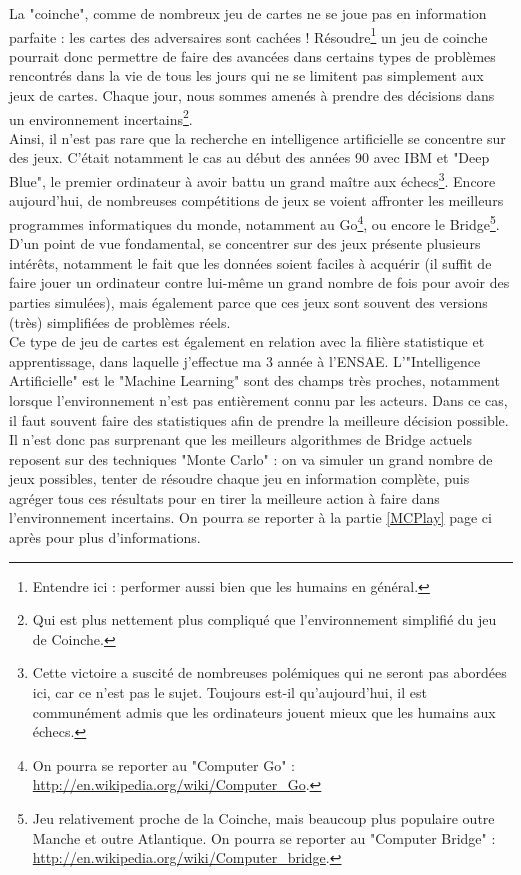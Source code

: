 \documentclass[a4paper,11pt]{article}
\begin{document}
La "coinche", comme de nombreux jeu de cartes ne se joue pas en information parfaite : les cartes des adversaires sont cachées ! Résoudre\footnote{Entendre ici : performer aussi bien que les humains en général.} un jeu de coinche pourrait donc permettre de faire des avancées dans certains types de problèmes rencontrés dans la vie de tous les jours qui ne se limitent pas simplement aux jeux de cartes. Chaque jour, nous sommes amenés à prendre des décisions dans un environnement incertains\footnote{Qui est plus nettement plus compliqué que l'environnement simplifié du jeu de Coinche.}. \\
Ainsi, il n'est pas rare que la recherche en intelligence artificielle se concentre sur des jeux. C'était notamment le cas au début des années 90 avec IBM et "Deep Blue", le premier ordinateur à avoir battu un grand maître aux échecs\footnote{Cette victoire a suscité de nombreuses polémiques qui ne seront pas abordées ici, car ce n'est pas le sujet. Toujours est-il qu'aujourd'hui, il est communément admis que les ordinateurs jouent mieux que les humains aux échecs.}. Encore aujourd'hui, de nombreuses compétitions de jeux se voient affronter les meilleurs programmes informatiques du monde, notamment au Go\footnote{On pourra se reporter au "Computer Go" :  \url{http://en.wikipedia.org/wiki/Computer_Go}.}, ou encore le Bridge\footnote{Jeu relativement proche de la Coinche, mais beaucoup plus populaire outre Manche et outre Atlantique. On pourra se reporter au "Computer Bridge" : \url{http://en.wikipedia.org/wiki/Computer_bridge}.}. D'un point de vue fondamental, se concentrer sur des jeux présente plusieurs intérêts, notamment le fait que les données soient faciles à acquérir (il suffit de faire jouer un ordinateur contre lui-même un grand nombre de fois pour avoir des parties simulées), mais également parce que ces jeux sont souvent des versions (très) simplifiées de problèmes réels. \\
Ce type de jeu de cartes est également en relation avec la filière statistique et apprentissage, dans laquelle j'effectue ma 3\ieme{} année à l'ENSAE. L'"Intelligence Artificielle" est le "Machine Learning" sont des champs très proches, notamment lorsque l'environnement n'est pas entièrement connu par les acteurs. Dans ce cas, il faut souvent faire des statistiques afin de prendre la meilleure décision possible. Il n'est donc pas surprenant que les meilleurs algorithmes de Bridge actuels reposent sur des techniques "Monte Carlo" : on va simuler un grand nombre de jeux possibles, tenter de résoudre chaque jeu en information complète, puis agréger tous ces résultats pour en tirer la meilleure action à faire dans l'environnement incertains. On pourra se reporter à la partie \ref{MCPlay} page \pageref{sec:MCPlay} ci après pour plus d'informations. \\
\end{document}

